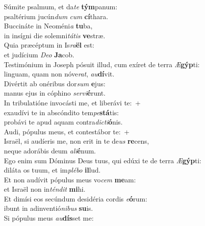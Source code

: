 \evenverse Súmite psalmum, et da\textit{te} \textbf{tým}panum:~\*\\
\evenverse psaltérium jucún\textit{dum} \textit{cum} \textbf{cí}thara.\\
\oddverse Buccináte in Neoméni\textit{a} \textbf{tu}ba,~\*\\
\oddverse in insígni die solemni\textit{tá}\textit{tis} \textbf{ve}stræ.\\
\evenverse Quia præcéptum in Is\textit{ra}\textbf{ël} est:~\*\\
\evenverse et judícium \textit{De}\textit{o} \textbf{Ja}cob.\\
\oddverse Testimónium in Joseph pósuit illud, cum exíret de terra \textit{Æ}\textbf{gýp}ti:~\*\\
\oddverse linguam, quam non nóve\textit{rat}, \textit{au}\textbf{dí}vit.\\
\evenverse Divértit ab onéribus dor\textit{sum} \textbf{e}jus:~\*\\
\evenverse manus ejus in cóphino \textit{ser}\textit{vi}\textbf{é}runt.\\
\oddverse In tribulatióne invocásti me, et liberávi te:~+\\
\oddverse  exaudívi te in abscóndito tem\textit{pe}\textbf{stá}tis:~\*\\
\oddverse probávi te apud aquam contra\textit{di}\textit{cti}\textbf{ó}nis.\\
\evenverse Audi, pópulus meus, et contestábor te:~+\\
\evenverse  Israël, si audíeris me, non erit in te de\textit{us} \textbf{re}cens,~\*\\
\evenverse neque adorábis deum \textit{a}\textit{li}\textbf{é}num.\\
\oddverse Ego enim sum Dóminus Deus tuus, qui edúxi te de terra \textit{Æ}\textbf{gýp}ti:~\*\\
\oddverse diláta os tuum, et im\textit{plé}\textit{bo} \textbf{il}lud.\\
\evenverse Et non audívit pópulus meus vo\textit{cem} \textbf{me}am:~\*\\
\evenverse et Israël non in\textit{tén}\textit{dit} \textbf{mi}hi.\\
\oddverse Et dimísi eos secúndum desidéria cordis \textit{e}\textbf{ó}rum:~\*\\
\oddverse ibunt in adinventió\textit{ni}\textit{bus} \textbf{su}is.\\
\evenverse Si pópulus meus \textit{au}\textbf{dís}set me:~\*\\
